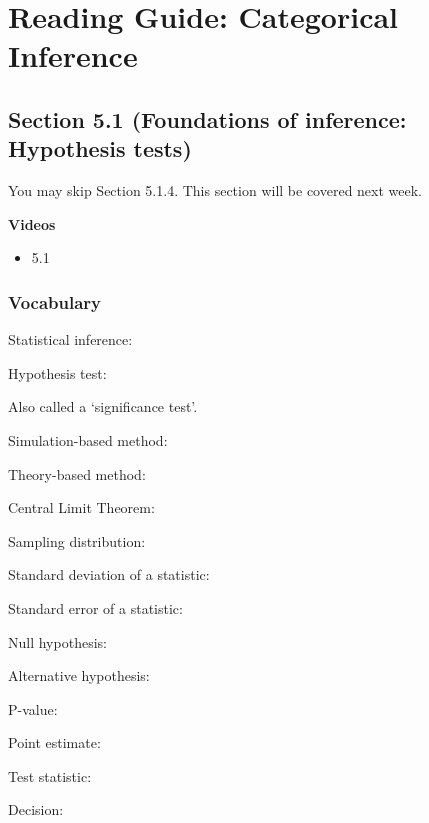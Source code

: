 \documentclass[
]{report}
\providecommand{\tightlist}{%
  \setlength{\itemsep}{0pt}\setlength{\parskip}{0pt}}
\newcommand{\rgs}{\vspace{12pt}} %
\newcommand{\rgi}{\hspace{24pt}}  %
\begin{document}
\hypertarget{reading-guide-categorical-inference}{%
\section{Reading Guide: Categorical Inference}\label{reading-guide-categorical-inference}}

\hypertarget{section-5.1-foundations-of-inference-hypothesis-tests}{%
\subsection*{Section 5.1 (Foundations of inference: Hypothesis tests)}\label{section-5.1-foundations-of-inference-hypothesis-tests}}

You may skip Section 5.1.4. This section will be covered next week.

\textbf{Videos}

\begin{itemize}
\tightlist
\item
  5.1
\end{itemize}


\hypertarget{vocabulary-10}{%
\subsubsection*{Vocabulary}\label{vocabulary-10}}

Statistical inference:
\rgs

Hypothesis test:

\rgi Also called a `significance test'.
\rgs

Simulation-based method:
\rgs

Theory-based method:
\rgs

Central Limit Theorem:
\rgs

Sampling distribution:
\rgs

Standard deviation of a statistic:
\rgs

Standard error of a statistic:
\rgs

Null hypothesis:
\rgs

Alternative hypothesis:
\rgs

P-value:
\rgs

Point estimate:
\rgs

Test statistic:
\rgs

Decision:
\rgs
\end{document}
